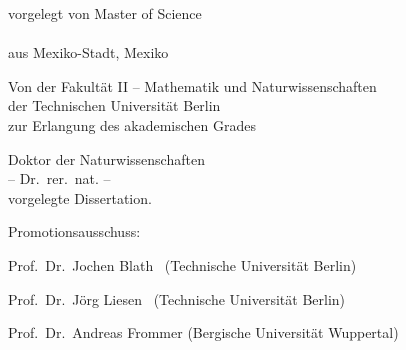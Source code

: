 \begin{titlepage}
  \null
  \vspace{1cm}
  \begin{center}
    \huge\sffamily\bfseries
    \doctitle
  \end{center}
  \begin{center}
    \Large\sffamily\bfseries
    \docsubtitle
  \end{center}
  \vspace{0.75cm}
  \begin{center}
    vorgelegt von Master of Science\\
    \medskip
    {\sffamily\bfseries\Large\docauthor}\\
    \medskip
    aus Mexiko-Stadt, Mexiko
  \end{center}
  \vspace{0.75cm}
  \begin{center}
    Von der Fakult\"at II -- Mathematik und Naturwissenschaften\\
    der Technischen Universit\"at Berlin\\
    zur Erlangung des akademischen Grades\\

    \medskip

    Doktor der Naturwissenschaften\\
    -- Dr.\ rer.\ nat. --\\

    \medskip
    vorgelegte Dissertation.
  \end{center}
  \vspace{0.75cm}
  \begin{center}
    \begin{varwidth}{\textwidth}
      Promotionsausschuss: %
      \begin{description}[style=multiline,
                          leftmargin=3.5cm,font=\normalfont,noitemsep]
        \item[Vorsitzender:] Prof.\ Dr.\ Jochen Blath \hspace{0.53cm} \ (Technische Universit\"at Berlin)
        \item[1. Gutachter:] Prof.\ Dr.\ J\"org Liesen \hspace{0.81cm} \ (Technische Universit\"at Berlin)
        \item[2. Gutachter:] Prof.\ Dr.\ Andreas Frommer \hspace{0.1cm} (Bergische Universität Wuppertal)
      \end{description}


\end{varwidth}
\end{center}
\end{titlepage}
